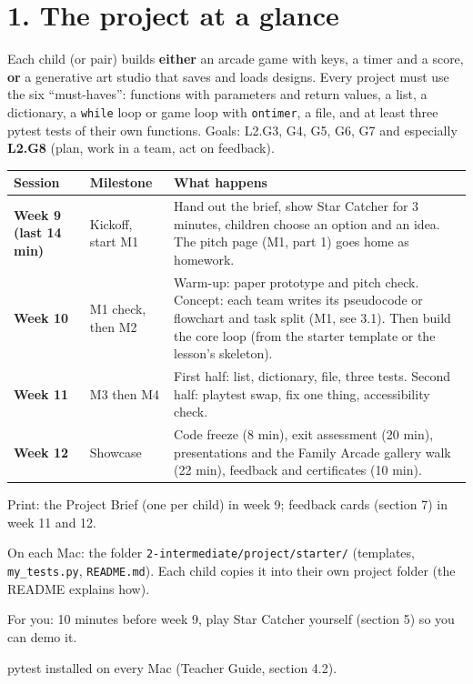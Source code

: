 \documentclass[level=2,teacher]{kidscode}
\begin{document}

\setcounter{tocdepth}{1}
\tableofcontents

\section{1. The project at a glance}
Each child (or pair) builds \textbf{either} an arcade game with keys, a timer and a score,
\textbf{or} a generative art studio that saves and loads designs. Every project must use the six
\enquote{must-haves}: functions with parameters and return values, a list, a dictionary, a
\texttt{while} loop or game loop with \texttt{ontimer}, a file, and at least three pytest tests of
their own functions. Goals: L2.G3, G4, G5, G6, G7 and especially \textbf{L2.G8} (plan, work in a team,
act on feedback).

{\small
\renewcommand{\arraystretch}{1.3}
\begin{longtable}{@{}>{\bfseries}p{1.6cm}>{\raggedright\arraybackslash}p{4.4cm}>{\raggedright\arraybackslash}p{8.6cm}@{}}
\toprule
Session & Milestone & What happens \\ \midrule\endhead
Week 9 (last 14 min) & Kickoff, start M1 & Hand out the brief, show Star Catcher for 3 minutes, children choose an option and an idea. The pitch page (M1, part 1) goes home as homework. \\
Week 10 & M1 check, then M2 & Warm-up: paper prototype and pitch check. Concept: each team writes its pseudocode or flowchart and task split (M1, see 3.1). Then build the core loop (from the starter template or the lesson's skeleton). \\
Week 11 & M3 then M4 & First half: list, dictionary, file, three tests. Second half: playtest swap, fix one thing, accessibility check. \\
Week 12 & Showcase & Code freeze (8 min), exit assessment (20 min), presentations and the Family Arcade gallery walk (22 min), feedback and certificates (10 min). \\
\bottomrule
\end{longtable}}

\begin{materials}
  \item Print: the Project Brief (one per child) in week 9; feedback cards (section 7) in week 11 and 12.
  \item On each Mac: the folder \texttt{2-intermediate/project/starter/} (templates, \texttt{my\_tests.py},
        \texttt{README.md}). Each child copies it into their own project folder (the README explains how).
  \item For you: 10 minutes before week 9, play Star Catcher yourself (section 5) so you can demo it.
  \item pytest installed on every Mac (Teacher Guide, section 4.2).
\end{materials}
\end{document}
